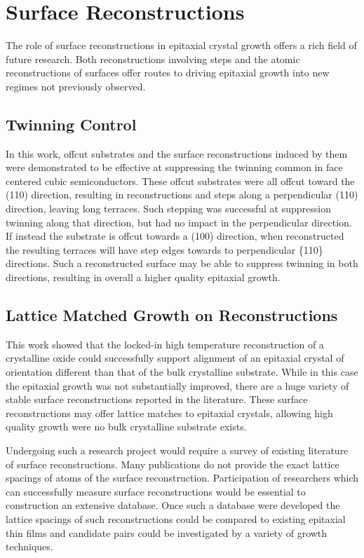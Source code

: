 \section{Surface Reconstructions}
The role of surface reconstructions in epitaxial crystal growth offers a rich field of future research. Both reconstructions involving steps and the atomic reconstructions of surfaces offer routes to driving epitaxial growth into new regimes not previously observed.
\subsection{Twinning Control}
In this work, offcut substrates and the surface reconstructions induced by them were demonstrated to be effective at suppressing the twinning common in face centered cubic semiconductors. These offcut substrates were all offcut toward the (110) direction, resulting in reconstructions and steps along a perpendicular (110) direction, leaving long terraces. Such stepping was successful at suppression twinning along that direction, but had no impact in the perpendicular direction. If instead the substrate is offcut towards a (100) direction, when reconstructed the resulting terraces will have step edges towards to perpendicular \{110\} directions. Such a reconstructed surface may be able to suppress twinning in both directions, resulting in overall a higher quality epitaxial growth.
\subsection{Lattice Matched Growth on Reconstructions}
This work showed that the locked-in high temperature reconstruction of a crystalline oxide could successfully support alignment of an epitaxial crystal of orientation different than that of the bulk crystalline substrate. While in this case the epitaxial growth was not substantially improved, there are a huge variety of stable surface reconstructions reported in the literature. These surface reconstructions may offer lattice matches to epitaxial crystals, allowing high quality growth were no bulk crystalline substrate exists.

Undergoing such a research project would require a survey of existing literature of surface reconstructions. Many publications do not provide the exact lattice spacings of atoms of the surface reconstruction. Participation of researchers which can successfully measure surface reconstructions would be essential to construction an extensive database. Once such a database were developed the lattice spacings of such reconstructions could be compared to existing epitaxial thin films and candidate pairs could be investigated by a variety of growth techniques.


